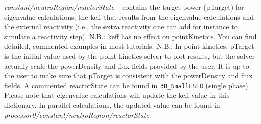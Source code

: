 \begin{DoxyItemize}
\item {\itshape constant/neutro\+Region/reactor\+State} – contains the target power (p\+Target) for eigenvalue calculations, the keff that results from the eigenvalue calculations and the external reactivity (i.\+e., the extra reactivity one can add for instance to simulate a reactivity step). N.\+B.\+: keff has no effect on point\+Kinetics. You can find detailed, commented examples in most tutorials. N.\+B.\+: In point kinetics, p\+Target is the initial value used by the point kinetics solver to plot results, but the solver actually scale the power\+Density and flux fields provided by the user. It is up to the user to make sure that p\+Target is consistent with the power\+Density and flux fields. A commented reactor\+State can be found in \href{https://gitlab.com/foam-for-nuclear/GeN-Foam/-/tree/master/Tutorials/3D_SmallESFR/rootCase/constant/neutroRegion/reactorState}{\tt 3\+D\+\_\+\+Small\+E\+S\+FR} (single phase). Please note that eigenvalue calculations will update the keff value in this dictionary. In parallel calculations, the updated value can be found in {\itshape processor0/constant/neutro\+Region/reactor\+State}.

\end{DoxyItemize}
